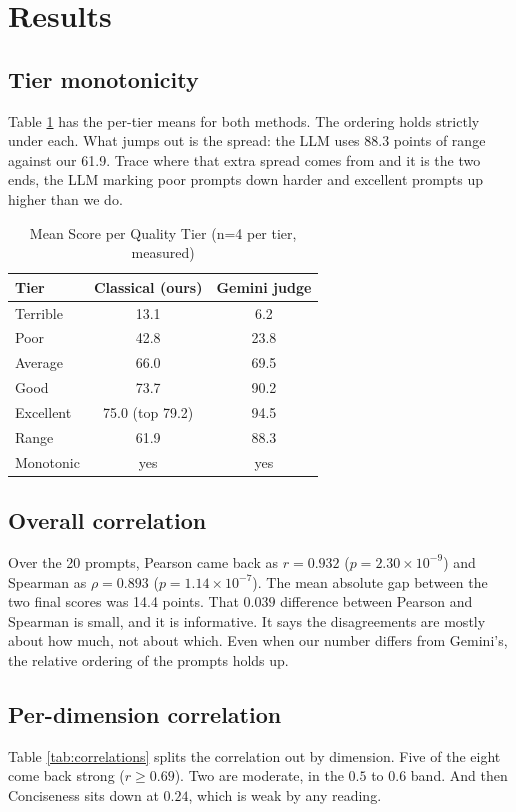 \documentclass[conference]{IEEEtran}
\begin{document}
\section{Results}

\subsection{Tier monotonicity}
Table \ref{tab:tiers} has the per-tier means for both methods. The ordering holds strictly under each. What jumps out is the spread: the LLM uses 88.3 points of range against our 61.9. Trace where that extra spread comes from and it is the two ends, the LLM marking poor prompts down harder and excellent prompts up higher than we do.

\begin{table}[t]
\centering
\caption{Mean Score per Quality Tier (n=4 per tier, measured)}
\label{tab:tiers}
\begin{tabular}{lcc}
\toprule
\textbf{Tier} & \textbf{Classical (ours)} & \textbf{Gemini judge} \\
\midrule
Terrible  & 13.1 & 6.2  \\
Poor      & 42.8 & 23.8 \\
Average   & 66.0 & 69.5 \\
Good      & 73.7 & 90.2 \\
Excellent & 75.0 (top 79.2) & 94.5 \\
\midrule
Range     & 61.9 & 88.3 \\
Monotonic & yes  & yes  \\
\bottomrule
\end{tabular}
\end{table}

\subsection{Overall correlation}
Over the 20 prompts, Pearson came back as $r = 0.932$ ($p = 2.30 \times 10^{-9}$) and Spearman as $\rho = 0.893$ ($p = 1.14 \times 10^{-7}$). The mean absolute gap between the two final scores was 14.4 points. That $0.039$ difference between Pearson and Spearman is small, and it is informative. It says the disagreements are mostly about how much, not about which. Even when our number differs from Gemini's, the relative ordering of the prompts holds up.

\subsection{Per-dimension correlation}
Table \ref{tab:correlations} splits the correlation out by dimension. Five of the eight come back strong ($r \geq 0.69$). Two are moderate, in the $0.5$ to $0.6$ band. And then Conciseness sits down at $0.24$, which is weak by any reading.
\end{document}
